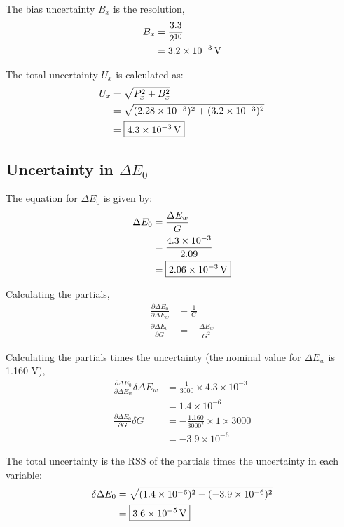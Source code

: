 The bias uncertainty $B_x$ is the resolution, 
\begin{align*}
    B_x &= \frac{3.3}{2^{10}} \\
    &= \qty{3.2E-03}{V}
\end{align*}

The total uncertainty $U_x$ is calculated as:
\begin{align*}
    U_x &= \sqrt{P_x^2 + B_x^2} \\
    &= \sqrt{(2.28\times 10^{-3})^2 + (3.2 \times 10^{-3})^2} \\
    &= \boxed{\qty{4.3E-03}{V}}
\end{align*}

\subsection{Uncertainty in $\Delta E_0$}
The equation for $\Delta E_0$ is given by:
\begin{align*}
    \Delta E_0 &= \frac{\Delta E_w}{G} \\
    &= \frac{4.3 \times 10^{-3}}{2.09} \\
    &= \boxed{\qty{2.06E-03}{V}}
\end{align*}

Calculating the partials,
\begin{align*}
    \frac{\partial \Delta E_0}{\partial \Delta E_w} &= \frac{1}{G} \\
    \frac{\partial \Delta E_0}{\partial G} &= -\frac{\Delta E_w}{G^2}
\end{align*}

Calculating the partials times the uncertainty (the nominal value for $\Delta E_w$ is 1.160 V),
\begin{align*}
    \frac{\partial \Delta E_0}{\partial \Delta E_w} \delta \Delta E_w &=  \frac{1}{3000} \times 4.3 \times 10^{-3} \\
    & = 1.4\times 10^{-6} \\
    \frac{\partial \Delta E_0}{\partial G} \delta G &=  -\frac{1.160}{3000^2} \times 1 \times 3000 \\
    & = -3.9\times 10^{-6}
\end{align*}

The total uncertainty is the RSS of the partials times the uncertainty in each variable:
\begin{align*}
    \delta \Delta E_0 &= \sqrt{(1.4\times 10^{-6})^2 + (-3.9\times 10^{-6})^2} \\
    &= \boxed{\qty{3.6E-5}{V}}
\end{align*}